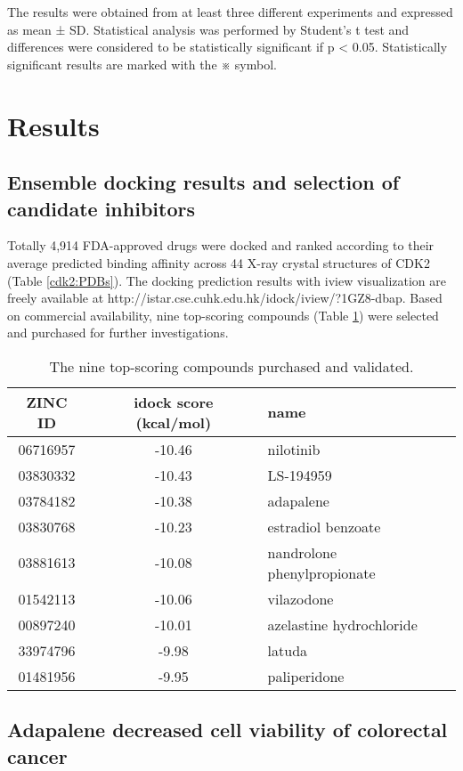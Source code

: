 The results were obtained from at least three different experiments and expressed as mean ± SD. Statistical analysis was performed by Student's t test and differences were considered to be statistically significant if p < 0.05. Statistically significant results are marked with the ※ symbol.

\section{Results}

\subsection{Ensemble docking results and selection of candidate inhibitors}

Totally 4,914 FDA-approved drugs were docked and ranked according to their average predicted binding affinity across 44 X-ray crystal structures of CDK2 (Table \ref{cdk2:PDBs}). The docking prediction results with iview visualization \citep{1366} are freely available at http://istar.cse.cuhk.edu.hk/idock/iview/?1GZ8-dbap. Based on commercial availability, nine top-scoring compounds (Table \ref{cdk2:Top9}) were selected and purchased for further investigations.

\begin{table}
\caption{The nine top-scoring compounds purchased and validated.}
\label{cdk2:Top9}
\begin{tabular}{ccl}
\hline
ZINC ID & idock score (kcal/mol) & name\\
\hline
06716957 & -10.46 & nilotinib\\
03830332 & -10.43 & LS-194959\\
03784182 & -10.38 & adapalene\\
03830768 & -10.23 & estradiol benzoate\\
03881613 & -10.08 & nandrolone phenylpropionate\\
01542113 & -10.06 & vilazodone\\
00897240 & -10.01 & azelastine hydrochloride\\
33974796 &  -9.98 & latuda\\
01481956 &  -9.95 & paliperidone\\
\hline
\end{tabular}
\end{table}

\subsection{Adapalene decreased cell viability of colorectal cancer}

